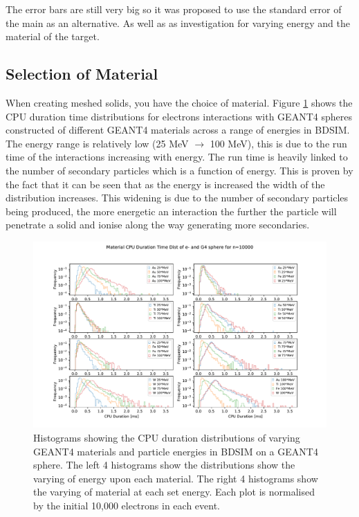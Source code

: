 \documentclass[12pt,a4paper]{article}
\begin{document}
The error bars are still very big so it was proposed to use the standard error of the main as an alternative. As well as as investigation for varying energy and the material of the target.

\subsection{Selection of Material}
When creating meshed solids, you have the choice of material. Figure \ref{novar} shows the CPU duration time distributions for electrons interactions with GEANT4 spheres constructed of different GEANT4 materials across a range of energies in BDSIM. The energy range is relatively low (25 MeV $\rightarrow$ 100 MeV), this is due to the run time of the interactions increasing with energy. The run time is heavily linked to the number of secondary particles which is a function of energy. This is proven by the fact that it can be seen that as the energy is increased the width of the distribution increases. This widening is due to the number of secondary particles being produced, the more energetic an interaction the further the particle will penetrate a solid and ionise along the way generating more secondaries.

\begin{figure}[h!]
\centering
\includegraphics[scale=0.6]{Images//Materials//not_Varied_by_radius_and_secondaries.pdf}
\caption[width=\columnwidth]{Histograms showing the CPU duration distributions of varying GEANT4 materials and particle energies in BDSIM on a GEANT4 sphere. The left 4 histograms show the distributions show the varying of energy upon each material. The right 4 histograms show the varying of material at each set energy. Each plot is normalised by the initial 10,000 electrons in each event.}
\label{novar}
\end{figure}
\end{document}
